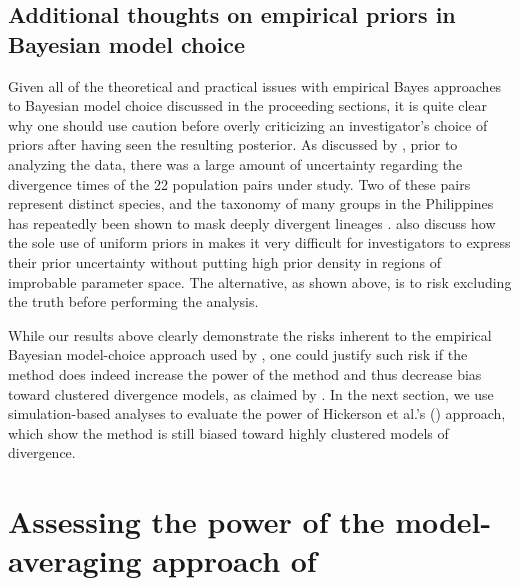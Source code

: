 \subsection*{Additional thoughts on empirical priors in Bayesian model choice}
Given all of the theoretical and practical issues with empirical Bayes
approaches to Bayesian model choice discussed in the proceeding sections, it is
quite clear why one should use caution before overly criticizing an
investigator's choice of priors after having seen the resulting posterior.
As discussed by \citet{Oaks2012}, prior to analyzing the data, there was a large
amount of uncertainty regarding the divergence times of the 22 population pairs
under study.
Two of these pairs represent distinct species, and the taxonomy of many groups
in the Philippines has repeatedly been shown to mask deeply divergent lineages
\citep{RafeDiesmosAlcala2008,Linkem2010,Siler2010,Welton2010,Siler2011HerpMonographs,
    Siler2011,Siler2012,RafeStuart2012,LinkemBrown2013}.
\citet{Oaks2012} also discuss how the sole use of uniform priors in \msb makes
it very difficult for investigators to express their prior uncertainty without
putting high prior density in regions of improbable parameter space.
The alternative, as shown above, is to risk excluding the truth before
performing the analysis.

While our results above clearly demonstrate the risks inherent to the empirical
Bayesian model-choice approach used by \citet{Hickerson2013}, one could justify
such risk if the method does indeed increase the power of the method and thus
decrease bias toward clustered divergence models, as claimed by
\citet{Hickerson2013}.
In the next section, we use simulation-based analyses to evaluate the power of
Hickerson et al.'s (\citeyear{Hickerson2013}) approach, which show the method is
still biased toward highly clustered models of divergence.





\section*{Assessing the power of the model-averaging approach of
    \citet{Hickerson2013}}

